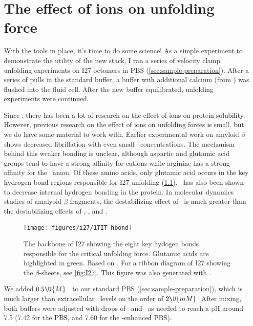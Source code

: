 \chapter{The effect of ions on unfolding force}
\label{sec:salt}

With the tools in place, it's time to do some science!  As a simple
experiment to demonstrate the utility of the new stack, I ran a series
of velocity clamp unfolding experiments on I27 octomers in PBS
(\cref{sec:sample-preparation}).  After a series of pulls in the
standard buffer, a buffer with additional calcium (from
\CaCl\citep{fisher-CaCl}) was flushed into the fluid cell.  After the
new buffer equilibrated, unfolding experiments were continued.

Since \citet{hofmeister88}, there has been a lot of research on the
effect of ions on protein solubility.  However, previous research on
the effect of ions on unfolding forces is small, but we do have some
material to work with.  Earlier experimental work on amyloid $\beta$
shows decreased fibrillation with even small
\Ca\ concentrations\citep{chauhan97,itkin11}.  The mechanism behind
this weaker bonding is unclear\citep{chauhan97,zhang06}, although
aspartic and glutamic acid groups tend to have a strong affinity for
cations while arginine has a strong affinity for the
\Cl\ anion\citep{friedman11}.  Of these amino acids, only glutamic
acid occurs in the key hydrogen bond regions responsible for I27
unfolding\citep{lu00b} (\cref{fig:I27:H-bonds}).  \NaCl\ has also been
shown to decrease internal hydrogen bonding in the
protein\citep{zidar11}.  In molecular dynamics studies of amalyoid
$\beta$ fragments, the destabilizing effect of \CaCl\ is much greater
than the destabilizing effects of \MgCl, \NaCl, and
\KCl\citep{smith13}.

\begin{figure}
  \begin{center}
    \texttt{[image: figures/i27/1TIT-hbond]}
    \caption{The backbone of I27 showing the eight key hydogen bonds
      responsible for the critical unfolding force.  Glutamic acids
      are highlighted in green.  Based on .
      For a ribbon diagram of I27 showing the $\beta$-sheets, see
      \cref{fig:I27}.  This figure was also generated with
      .\label{fig:I27:H-bonds}}
  \end{center}
\end{figure}

We added $0.5\U{M}$ \CaCl\ to our standard PBS
(\cref{sec:sample-preparation}), which is much larger than
extracellular \Ca\ levels on the order of
$2\U{mM}$\citep{isaacs06,itkin11}.  After mixing, both buffers were
adjusted with drops of \HCl\ and \NaOH\ as needed to reach a pH around
7.5 (7.42 for the PBS, and 7.60 for the \Ca-enhanced PBS).

